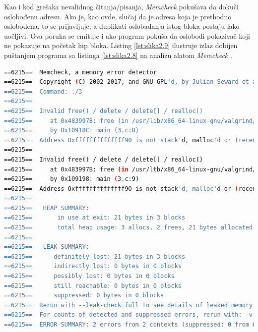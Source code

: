\documentclass[12pt,oneside]{memoir}
\theoremstyle{plain}
\theoremstyle{definition}
\begin{document}

Kao i kod grešaka nevalidnog čitanja/pisanja, \textit{Memcheck} pokušava da dokuči oslobođenu adresu. Ako je, kao ovde, slučaj da je adresa koja je prethodno oslobođena, to se prijavljuje, a duplikati oslobađanja istog bloka postaju lako uočljivi. Ova poruka se emituje i ako program pokuša da oslobodi pokazivač koji ne pokazuje na početak hip bloka. Listing \ref{lst:slika2.9} ilustruje izlaz dobijen puštanjem programa sa listinga \ref{lst:slika2.8} na analizu alatom \textit{Memcheck} \cite{ValgrindDOC}. 


\begin{lstlisting}[style=terminal,caption={Primer ispisa greške nedopuštenog oslobađanja memorije}, label={lst:slika2.9},language={bash}] 
==6215==  Memcheck, a memory error detector
==6215==  Copyright (C) 2002-2017, and GNU GPL'd, by Julian Seward et al. Using Valgrind-3.14.0 and LibVEX; rerun with -h for copyright info 
==6215==  Command: ./3
==6215== 
==6215==  Invalid free() / delete / delete[] / realloc()
==6215==     at 0x483997B: free (in /usr/lib/x86_64-linux-gnu/valgrind/vgpreload_memcheck-amd64-linux.so) 
==6215==     by Ox10918C: main (3.c:8)
==6215==  Address Oxffffffffffffff90 is not stack'd, malloc'd or (recently) free'd
==6215== 
==6215==  Invalid free() / delete / delete[] / realloc()
==6215==     at 0x483997B: free (in /usr/ltb/x86_64-linux-gnu/valgrind/vgpreload_memcheck-amd64-linux.so) 
==6215==     by 0x109198: main (3.c:9)
==6215==  Address Oxffffffffffffff9O is not stack'd, malloc'd or (recently) free'd
==6215== 
==6215==   HEAP SUMMARY:
==6215==       in use at exit: 21 bytes in 3 blocks
==6215==       total heap usage: 3 allocs, 2 frees, 21 bytes allocated
==6215== 
==6215==   LEAK SUMMARY:
==6215==      definitely lost: 21 bytes in 3 blocks 
==6215==      indirectly lost: 0 bytes in 0 blocks
==6215==      possibly lost: 0 bytes in 0 blocks 
==6215==      still reachable: 0 bytes in 0 blocks
==6215==      suppressed: 0 bytes in 0 blocks
==6215==  Rerun with --leak-check=full to see details of leaked memory
==6215==  For counts of detected and suppressed errors, rerun with: -v 
==6215==  ERROR SUMMARY: 2 errors from 2 contexts (suppressed: 0 from 0)
\end{lstlisting}
\end{document}
